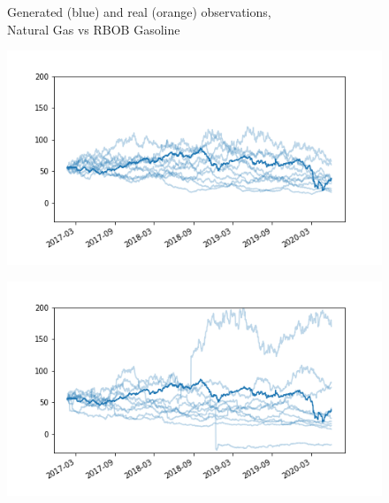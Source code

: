 \documentclass{article}
\begin{document}
\begin{figure}[!ht]
\begin{center}
\begin{minipage}{.33\linewidth}
            \label{fig:gen_tgan}
        \end{minipage}
        \caption{Generated (blue) and real (orange) observations, \\Natural Gas vs RBOB Gasoline}
        \label{fig:gens}
    \end{center}
\end{figure}

\begin{figure}[!ht]
    \begin{center}
        \begin{minipage}{.5\linewidth}
            \centering
            \includegraphics[width=\textwidth]{pics/path_gbm.png}
            \label{fig:gbm_path}
        \end{minipage}%
        \begin{minipage}{.5\linewidth}
            \centering
            \includegraphics[width=\textwidth]{pics/path_t_copula.png}
            \label{fig:t_copula_path}
        \end{minipage}

\end{center}
\end{figure}
\end{document}
